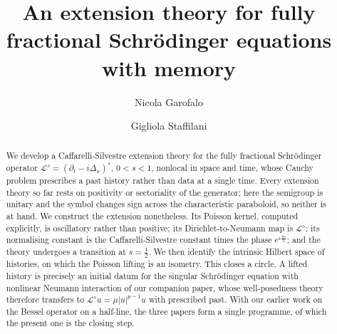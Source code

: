 \documentclass[11pt,letter]{amsart}
\numberwithin{equation}{section}
\newcommand{\Le}{\mathcal L}
\numberwithin{equation}{section}
\begin{document}

	
	
\title[]{An extension theory for fully fractional Schr\"odinger equations with memory} 
	


	
\date{}
	

\begin{abstract}
We develop a Caffarelli-Silvestre extension theory for the fully fractional
Schr\"odinger operator $\Le^s=(\partial_t-i\Delta_x)^s$, $0<s<1$, nonlocal in
space and time, whose Cauchy problem prescribes a past history rather than data
at a single time. Every extension theory so far rests on positivity or
sectoriality of the generator; here the semigroup is unitary and the symbol
changes sign across the characteristic paraboloid, so neither is at hand. We
construct the extension nonetheless. Its Poisson kernel, computed explicitly, is
oscillatory rather than positive; its Dirichlet-to-Neumann map is $\Le^s$; its
normalising constant is the Caffarelli-Silvestre constant times the phase
$e^{i\frac{\pi s}{2}}$; and the theory undergoes a transition at $s=\frac12$. We
then identify the intrinsic Hilbert space of histories, on which the Poisson
lifting is an isometry. This closes a circle. A lifted history is precisely an
initial datum for the singular Schr\"odinger equation with nonlinear Neumann
interaction of our companion paper, whose well-posedness theory therefore
transfers to $\Le^su=\mu|u|^{p-1}u$ with prescribed past. With our earlier work
on the Bessel operator on a half-line, the three papers form a single programme,
of which the present one is the closing step.
\end{abstract} 

	

\author{Nicola Garofalo}
\address{School of Mathematical and Statistical Sciences\\ Arizona State University}

\author{Gigliola Staffilani}
\address{Department of Mathematics\\ Massachusetts Institute of Technology\\
Cambridge, Massachusetts, 02141\\USA}
\end{document}
